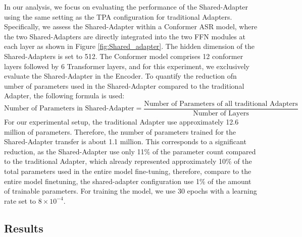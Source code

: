 In our analysis, we focus on evaluating the performance of the Shared-Adapter using the same setting as the TPA configuration for traditional Adapters. Specifically, we assess the Shared-Adapter within a Conformer ASR model, where the two Shared-Adapters are directly integrated into the two FFN modules at each layer as shown in Figure \ref{fig:Shared_adapter}.  The hidden dimension of the Shared-Adapters is set to 512. The Conformer model comprises 12 conformer layers followed by 6 Transformer layers, and for this experiment, we exclusively evaluate the Shared-Adapter in the Encoder.
To quantify the reduction ofn umber of parameters used in the Shared-Adapter compared to the traditional Adapter, the following formula is used:
\begin{equation}
    \text{Number of Parameters in Shared-Adapter} = \frac{\text{Number of Parameters of all traditional Adapters}}{\text{Number of Layers}}
\end{equation}
For our experimental setup, the traditional Adapter use approximately 12.6 million of parameters. Therefore, the number of parameters trained for the Shared-Adapter transfer is about 1.1 million. This corresponds to a significant reduction, as the Shared-Adapter use only 11\% of the parameter count compared to the traditional Adapter, which already represented approximately 10\% of the total parameters used in the entire model fine-tuning, therefore, compare to the entire model finetuning, the shared-adapter configuration use 1\% of the amount of trainable parameters.
For training the model, we use 30 epochs with a learning rate set to $8 \times 10^{-4}$. 

\subsection{Results}

